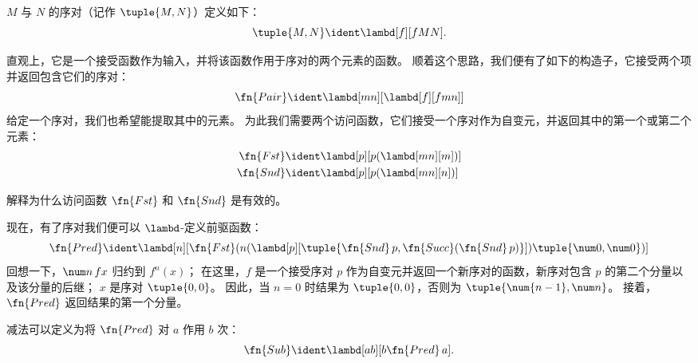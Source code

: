 \documentclass[../../../include/open-logic-section]{subfiles}
\begin{document}

\begin{defn}
$M$ 与 $N$ 的序对（记作 $\tuple{M,N}$）定义如下：
\[
\tuple{M,N} \ident \lambd[f][fMN].
\]
\end{defn}

直观上，它是一个接受函数作为输入，并将该函数作用于序对的两个元素的函数。
顺着这个思路，我们便有了如下的构造子，它接受两个项并返回包含它们的序对：
\[
  \fn{Pair} \ident \lambd[mn][\lambd[f][fmn]]
\]
给定一个序对，我们也希望能提取其中的元素。
为此我们需要两个访问函数，它们接受一个序对作为自变元，并返回其中的第一个或第二个元素：
\begin{align*}
  \fn{Fst} & \ident \lambd[p][p(\lambd[mn][m])]\\
  \fn{Snd} & \ident \lambd[p][p(\lambd[mn][n])]
\end{align*}

\begin{prob}
  解释为什么访问函数 $\fn{Fst}$ 和 $\fn{Snd}$ 是有效的。
\end{prob}

现在，有了序对我们便可以 $\lambd$-定义前驱函数：
\[
  \fn{Pred} \ident \lambd[n][\fn{Fst}(n (\lambd[p][\tuple{\fn{Snd}\, {p}, \fn{Succ}(\fn{Snd}\, {p})}]) \tuple{\num 0, \num 0})]
\]
回想一下，$\num n\, f x$ 归约到 $f^{n}(x)$；
在这里，$f$ 是一个接受序对 $p$ 作为自变元并返回一个新序对的函数，新序对包含 $p$ 的第二个分量以及该分量的后继；
$x$ 是序对 $\tuple{0,0}$。
因此，当 $n=0$ 时结果为 $\tuple{0,0}$，否则为 $\tuple{\num{n-1}, \num n}$。
接着，$\fn{Pred}$ 返回结果的第一个分量。

减法可以定义为将 $\fn{Pred}$ 对 $a$ 作用 $b$ 次：
\[
\fn{Sub} \ident \lambd[ab][b \fn{Pred}\, a].
\]
\end{document}
